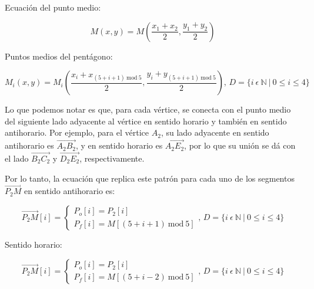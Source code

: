\documentclass[oneside, a4paper]{article}
\begin{document}
            Ecuación del punto medio:

            \begin{equation}
                M(x, y) = M(\frac{x_{1} + x_{2}}{2}, \frac{y_{1} + y_{2}}{2})
                \label{eq:middle_point}
            \end{equation}

            Puntos medios del pentágono:

            \begin{equation}
                M_{i}(x, y) = M_{i}(\frac{x_{i} + x_{(5 + i + 1) \: \textrm{mod} \: 5}}{2}, \frac{y_{i} + y_{(5 + i + 1) \: \textrm{mod} \: 5}}{2}) \textrm{, } D = \{ i \: \epsilon \: \mathbb{N} \: | \: 0 \leqslant i \leqslant 4 \}
                \label{eq:middle_points_pentagon}
            \end{equation}
            
            Lo que podemos notar es que, para cada vértice, se conecta con el punto medio del siguiente lado adyacente al vértice en sentido horario y también en sentido antihorario. Por ejemplo, para el vértice $A_{2}$, su lado adyacente en sentido antihorario es $\overrightarrow{A_{2}B_{2}}$, y en sentido horario es $\overrightarrow{A_{2}E_{2}}$, por lo que su unión se dá con el lado $\overrightarrow{B_{2}C_{2}}$ y $\overrightarrow{D_{2}E_{2}}$, respectivamente.

            Por lo tanto, la ecuación que replica este patrón para cada uno de los segmentos $\overrightarrow{P_{2}M}$ en sentido antihorario es:

            \begin{equation}
                \overrightarrow{P_{2}M}[i] =
                \begin{cases}
                    P_{o}[i] = P_{2}[i] \\
                    P_{f}[i] = M[(5 + i + 1) \: \textrm{mod} \: 5]
                \end{cases}
                \textrm{, } D = \{ i \: \epsilon \: \mathbb{N} \: | \: 0 \leqslant i \leqslant 4 \}
                \label{eq:union1_vertices_medians_central_pentagon}
            \end{equation}
            
            Sentido horario:
            
            \begin{equation}
                \overrightarrow{P_{2}M}[i] =
                \begin{cases}
                    P_{o}[i] = P_{2}[i] \\
                    P_{f}[i] = M[(5 + i - 2) \: \textrm{mod} \: 5]
                \end{cases}
                \textrm{, } D = \{ i \: \epsilon \: \mathbb{N} \: | \: 0 \leqslant i \leqslant 4 \}
                \label{eq:union2_vertices_medians_central_pentagon}
            \end{equation}
\end{document}

